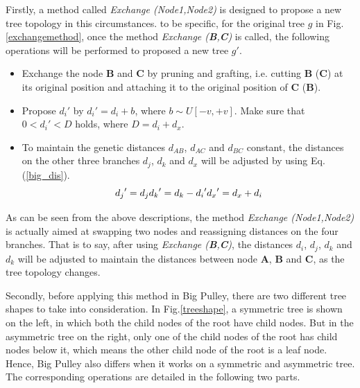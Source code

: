 \documentclass{bmcart}
\begin{document}
Firstly, a method called \textit{Exchange (Node1,Node2)} is designed to propose a new tree topology in this circumstances. to be specific, for the original tree $g$ in Fig.\ref{exchangemethod}, once the method \textit{Exchange (\textbf{B},\textbf{C})} is called, the following operations will be performed to proposed a new tree $g'$.
\begin{itemize}
\item Exchange the node \textbf{B} and \textbf{C} by pruning and grafting, i.e. cutting \textbf{B} (\textbf{C}) at its original position and attaching it to the original position of \textbf{C} (\textbf{B}).
\item Propose ${d_i}'$ by ${d_i}' = {d_i} + b$, where $b \sim U[ - v, + v]$. Make sure that $0 < {d_i}' < D$ holds, where $D = {d_i} + {d_x}$.
\item To maintain the genetic distances $d_{AB}$, $d_{AC}$ and $d_{BC}$ constant, the distances on the other three branches $d_j$, $d_k$ and $d_x$ will be adjusted by using Eq.(\ref{big_dis}).
\begin{equation}\label{big_dis}
{d_j}' = {d_j}\\
{d_k}' = {d_k} - {d_i}'\\
{d_x}' = {d_x} + {d_i}
\end{equation}
\end{itemize}

As can be seen from the above descriptions, the method \textit{Exchange (Node1,Node2)} is actually aimed at swapping two nodes and reassigning distances on the four branches. That is to say, after using \textit{Exchange (\textbf{B},\textbf{C})}, the distances $d_i$, $d_j$, $d_k$ and $d_k$ will be adjusted to maintain the distances between node \textbf{A}, \textbf{B} and \textbf{C}, as the tree topology changes. 

Secondly, before applying this method in Big Pulley, there are two different tree shapes to take into consideration. In Fig.\ref{treeshape}, a symmetric tree is shown on the left, in which both the child nodes of the root have child nodes. But in the asymmetric tree on the right, only one of the child nodes of the root has child nodes below it, which means the other child node of the root is a leaf node. Hence, Big Pulley also differs when it works on a symmetric and asymmetric tree. The corresponding operations are detailed in the following two parts.
\end{document}
